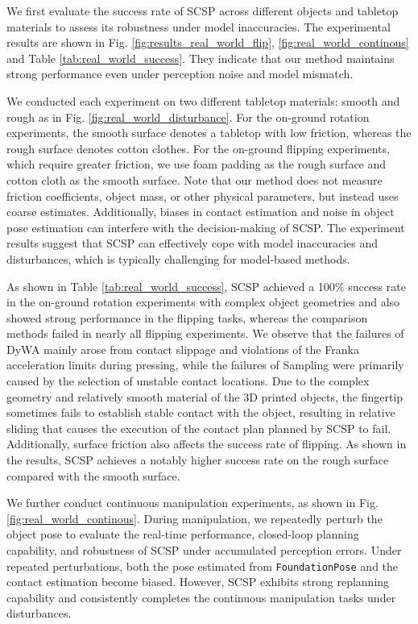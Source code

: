 We first evaluate the success rate of SCSP across different objects and tabletop materials to assess its robustness under model inaccuracies. The experimental results are shown in Fig. \ref{fig:results_real_world_flip}, \ref{fig:real_world_continous} and Table \ref{tab:real_world_success}. They indicate that our method maintains strong performance even under perception noise and model mismatch.

We conducted each experiment on two different tabletop materials: smooth and rough as in Fig. \ref{fig:real_world_disturbance}. For the on-ground rotation experiments, the smooth surface denotes a tabletop with low friction, whereas the rough surface denotes cotton clothes. For the on-ground flipping experiments, which require greater friction, we use foam padding as the rough surface and cotton cloth as the smooth surface. Note that our method does not measure friction coefficients, object mass, or other physical parameters, but instead uses coarse estimates. Additionally, biases in contact estimation and noise in object pose estimation can interfere with the decision-making of SCSP. The experiment results suggest that SCSP can effectively cope with model inaccuracies and disturbances, which is typically challenging for model-based methods. 

As shown in Table \ref{tab:real_world_success}, SCSP achieved a 100\% success rate in the on-ground rotation experiments with complex object geometries and also showed strong performance in the flipping tasks, whereas the comparison methods failed in nearly all flipping experiments. We observe that the failures of DyWA mainly arose from contact slippage and violations of the Franka acceleration limits during pressing, while the failures of Sampling were primarily caused by the selection of unstable contact locations. Due to the complex geometry and relatively smooth material of the 3D printed objects, the fingertip sometimes fails to establish stable contact with the object, resulting in relative sliding that causes the execution of the contact plan planned by SCSP to fail. Additionally, surface friction also affects the success rate of flipping. As shown in the results, SCSP achieves a notably higher success rate on the rough surface compared with the smooth surface.

We further conduct continuous manipulation experiments, as shown in Fig. \ref{fig:real_world_continous}. During manipulation, we repeatedly perturb the object pose to evaluate the real-time performance, closed-loop planning capability, and robustness of SCSP under accumulated perception errors. Under repeated perturbations, both the pose estimated from \texttt{FoundationPose} and the contact estimation become biased. However, SCSP exhibits strong replanning capability and consistently completes the continuous manipulation tasks under disturbances.

